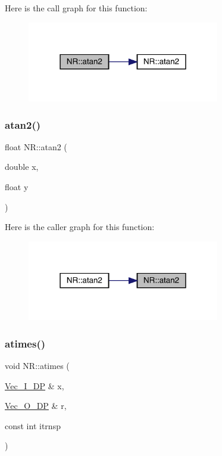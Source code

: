 Here is the call graph for this function\+:\nopagebreak
\begin{figure}[H]
\begin{center}
\leavevmode
\includegraphics[width=238pt]{da/d46/namespaceNR_afbe2717cf898de31cf6e00b84bfc3e8f_cgraph}
\end{center}
\end{figure}
\mbox{\label{namespaceNR_a2f18cc48b4090d59c9cfdcb2ecc45e20}} 
\subsubsection{\texorpdfstring{atan2()}{atan2()}\hspace{0.1cm}{\footnotesize\ttfamily [2/2]}}
{\footnotesize\ttfamily float N\+R\+::atan2 (\begin{DoxyParamCaption}\item[{double}]{x,  }\item[{float}]{y }\end{DoxyParamCaption})\hspace{0.3cm}{\ttfamily [inline]}}

Here is the caller graph for this function\+:\nopagebreak
\begin{figure}[H]
\begin{center}
\leavevmode
\includegraphics[width=238pt]{da/d46/namespaceNR_a2f18cc48b4090d59c9cfdcb2ecc45e20_icgraph}
\end{center}
\end{figure}
\mbox{\label{namespaceNR_a262c43d532c94b65394e128aa2bf565c}} 
\subsubsection{\texorpdfstring{atimes()}{atimes()}}
{\footnotesize\ttfamily void N\+R\+::atimes (\begin{DoxyParamCaption}\item[{\mbox{\hyperlink{namespaceNR_a9f943da53862537c552e2a770cb170ae}{Vec\+\_\+\+I\+\_\+\+DP}} \&}]{x,  }\item[{\mbox{\hyperlink{namespaceNR_a970094d23441f8ef6a45282a7eb2103d}{Vec\+\_\+\+O\+\_\+\+DP}} \&}]{r,  }\item[{const int}]{itrnsp }\end{DoxyParamCaption})}


